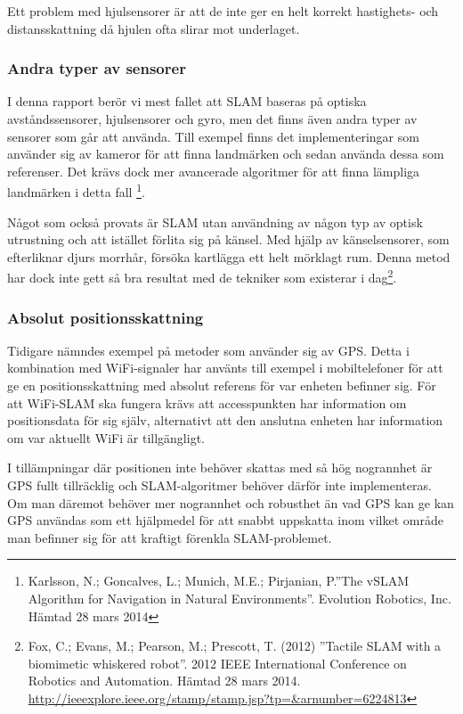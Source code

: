 \documentclass[a4paper,12pt,fleqn]{article}
\begin{document}
Ett problem med hjulsensorer är att de inte ger en helt korrekt hastighets- och distansskattning då hjulen ofta slirar mot underlaget.

\subsubsection{Andra typer av sensorer}

I denna rapport berör vi mest fallet att SLAM baseras på optiska avståndssensorer, hjulsensorer och gyro, men det finns även andra typer av sensorer som går att använda. Till exempel finns det implementeringar som använder sig av kameror för att finna landmärken och sedan använda dessa som referenser. Det krävs dock mer avancerade algoritmer för att finna lämpliga landmärken i detta fall \footnote{Karlsson, N.; Goncalves, L.; Munich, M.E.; Pirjanian, P.''The vSLAM Algorithm for Navigation in Natural Environments''. Evolution Robotics, Inc. Hämtad 28 mars 2014}.

Något som också provats är SLAM utan användning av någon typ av optisk utrustning och att istället förlita sig på känsel. Med hjälp av känselsensorer, som efterliknar djurs morrhår, försöka kartlägga ett helt mörklagt rum. Denna metod har dock inte gett så bra resultat med de tekniker som existerar i dag\footnote{Fox, C.; Evans, M.; Pearson, M.; Prescott, T. (2012)
''Tactile SLAM with a biomimetic whiskered robot''. 2012 IEEE International Conference on Robotics and Automation. Hämtad 28 mars 2014.
\url{http://ieeexplore.ieee.org/stamp/stamp.jsp?tp=&arnumber=6224813}
}. 

\subsubsection{Absolut positionsskattning}Tidigare nämndes exempel på metoder som använder sig av GPS. Detta i kombination med WiFi-signaler har använts till exempel i mobiltelefoner för att ge en positionsskattning med absolut referens för var enheten befinner sig. För att WiFi-SLAM ska fungera krävs att accesspunkten har information om positionsdata för sig själv, alternativt att den anslutna enheten har information om var aktuellt WiFi är tillgängligt.

I tillämpningar där positionen inte behöver skattas med så hög nogrannhet är GPS fullt tillräcklig och SLAM-algoritmer behöver därför inte implementeras. Om man däremot behöver mer nogrannhet och robusthet än vad GPS kan ge kan GPS användas som ett hjälpmedel för att snabbt uppskatta inom vilket område man befinner sig för att kraftigt förenkla SLAM-problemet. 
\end{document}
